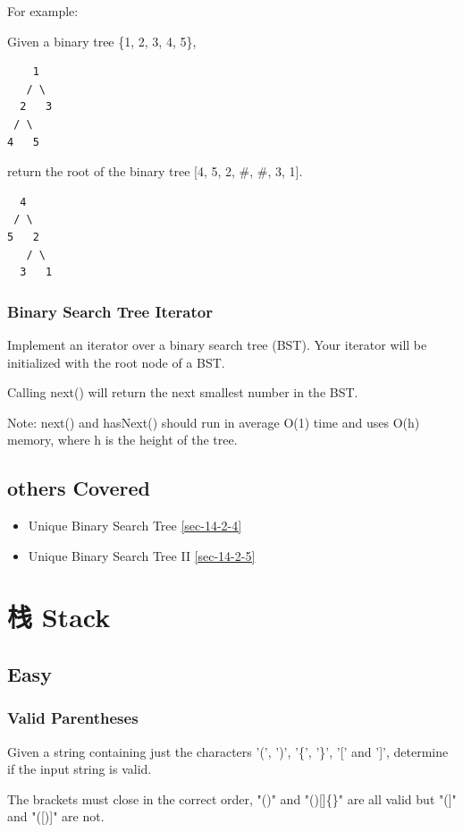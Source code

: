 \documentclass[12pt]{book}
\begin{document}
For example:

Given a binary tree \{1, 2, 3, 4, 5\},
\lstset{language=java,label= ,caption= ,numbers=none}
\begin{lstlisting}
    1
   / \
  2   3
 / \
4   5
\end{lstlisting}

return the root of the binary tree [4, 5, 2, \#, \#, 3, 1].
\lstset{language=java,label= ,caption= ,numbers=none}
\begin{lstlisting}
  4
 / \
5   2
   / \
  3   1
\end{lstlisting}

\subsection{Binary Search Tree Iterator}
\label{sec-4-4-9}
Implement an iterator over a binary search tree (BST). Your iterator will be initialized with the root node of a BST.

Calling next() will return the next smallest number in the BST.

Note: next() and hasNext() should run in average O(1) time and uses O(h) memory, where h is the height of the tree.

\section{others Covered}
\label{sec-4-5}
\begin{itemize}
\item Unique Binary Search Tree
\ref{sec-14-2-4}
\item Unique Binary Search Tree II
\ref{sec-14-2-5}
\end{itemize}

\chapter{栈 Stack}
\label{sec-5}
\section{Easy}
\label{sec-5-1}
\subsection{Valid Parentheses}
\label{sec-5-1-1}
Given a string containing just the characters '(', ')', '\{', '\}', '[' and ']', determine if the input string is valid.

The brackets must close in the correct order, "()" and "()[]\{\}" are all valid but "(]" and "([)]" are not.
\end{document}
